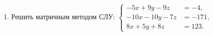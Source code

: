 \documentclass[a5paper,11pt]{extarticle}
\begin{document}
\begin{enumerate}
	\item 
	Решить матричным методом СЛУ: 
	$\left\lbrace\begin{aligned} 
    	-5x+ 9y- 9z &= -4,\\
    	-10x- 10y- 7z &= -171,\\
		8x+ 5y+ 8z &= 123.
   \end{aligned}\right.$






 





 














\end{enumerate}
\end{document}
